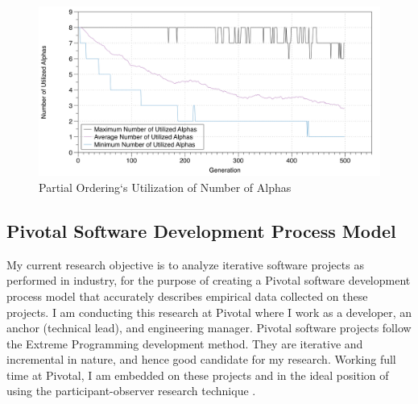 \documentclass[preprint,12pt,3p]{elsarticle}
\begin{document}
\begin{figure}[ht]\vspace*{4pt}
\centerline{\includegraphics[width=5.00in]{genetic_programming/number_of_alphas_partial_ordering_500gens_40runs_8alpha}}
\caption{Partial Ordering`s Utilization of Number of Alphas}\vspace*{-6pt}
\label{NumberOfAlphasPartialOrdering}
\end{figure}


\subsection{Pivotal Software Development Process Model}
\label{PivotalProcessModel}
My current research objective is to analyze iterative software projects as performed in industry, for the purpose of creating a Pivotal software development process model that accurately describes empirical data collected on these projects. I am conducting this research at Pivotal where I work as a developer, an anchor (technical lead), and engineering manager. Pivotal software projects follow the Extreme Programming \cite{ExtremeProgrammingExplained} development method. They are iterative and incremental in nature, and hence good candidate for my research. Working full time at Pivotal, I am embedded on these projects and in the ideal position of using the participant-observer research technique \cite{QualitativeMethods}. 
\end{document}
